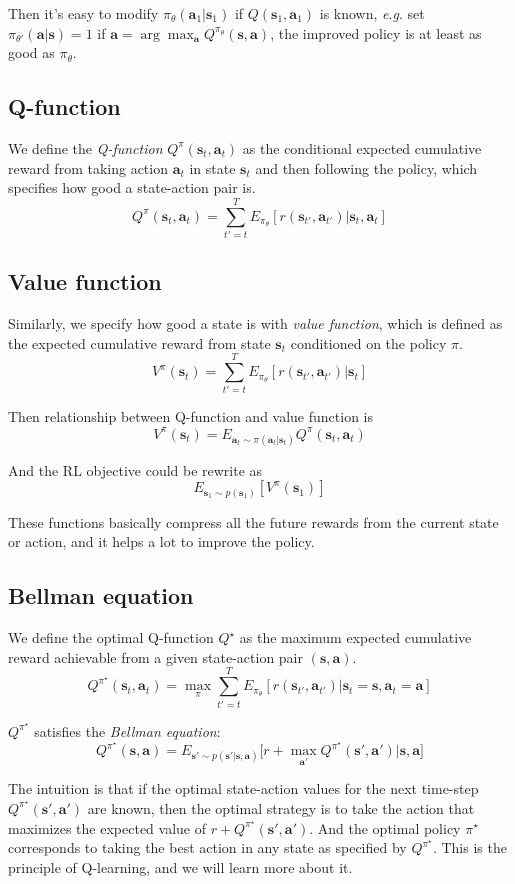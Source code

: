 \documentclass{tufte-handout}
\newcommand{\eg}{\textit{e}.\textit{g}. }
\newcommand{\s}{\mathbf{s}}
\newcommand{\act}{\mathbf{a}}
\begin{document}
Then it's easy to modify $\pi_\theta(\act_1 | \s_1) $ if $Q(\s_1, \act_1)$ is known, \eg set $\pi_{\theta'}(\act | \s) = 1$ if
$ \act = \arg \max_{\act} Q^{\pi_\theta}(\s, \act)$, the improved policy is at least as good as $\pi_\theta$.

\subsection{Q-function}

We define the \emph{Q-function} $Q^\pi(\s_t, \act_t)$ as the conditional expected cumulative reward from taking action $\act_t$ in state $\s_t$ and then following the policy, which specifies how good a state-action pair is.
\[
Q^\pi (\s_t, \act_t) = \sum_{t'=t}^T E_{\pi_\theta} [r(\s_{t'}, \act_{t'}) | \s_t, \act_t]
\]

\subsection{Value function}
Similarly, we specify how good a state is with \emph{value function}, which is defined as the expected cumulative reward from state $\s_t$ conditioned on the policy $\pi$.
\[
V^\pi (\s_t) = \sum_{t'=t}^T E_{\pi_\theta} [r(\s_{t'}, \act_{t'}) | \s_t]
\]

Then relationship between Q-function and value function is
\[
V^\pi (\s_t) = E_{\act_t \sim \pi(\act_t | \s_t)} Q^\pi (\s_t, \act_t)
\]

And the RL objective could be rewrite as
\[
E _{\s_1 \sim p(\s_1) }[V^\pi (\s_1)]
\]

These functions basically compress all the future rewards from the current state or action, and it helps a lot to improve the policy.

\subsection{Bellman equation}
We define the optimal Q-function $Q^\star$ as the maximum expected cumulative reward achievable from a given state-action pair $(\s, \act)$.
\[
Q^{\pi^\star} (\s_t, \act_t) =\max_\pi \sum_{t'=t}^T E_{\pi_\theta} [r(\s_{t'}, \act_{t'}) | \s_t = \s, \act_t = \act]
\]

$Q^{\pi^\star}$ satisfies the \emph{Bellman equation}:
\[
Q^{\pi^\star} (\s, \act) =E_{\s' \sim p(\s' | \s, \act)} \Big[r + \max_{\act'}  Q^{\pi^\star}(\s', \act') | \s, \act \Big]
\]

The intuition is that if the optimal state-action values for the next time-step $Q^{\pi^\star}(\s', \act')$ are known, then the optimal strategy is to take
the action that maximizes the expected value of $r + Q^{\pi^\star}(\s', \act')$. And the optimal policy $\pi^\star$ corresponds to taking the best action in any state as specified by $Q^{\pi^\star}$. This is the principle of Q-learning, and we will learn more about it.
\end{document}
